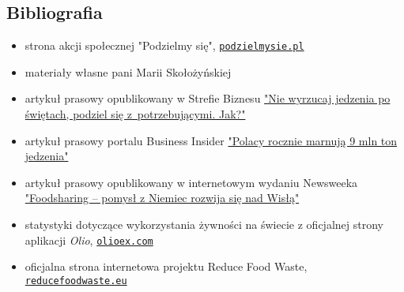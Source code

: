 \documentclass[11pt]{article}
\begin{document}
\subsection*{Bibliografia}
\begin{itemize}
\setlength\itemsep{-0.1em}
\item strona akcji społecznej "Podzielmy się", \href{www.podzielmysie.pl}{\texttt{podzielmysie.pl}}
\item materiały własne pani Marii Skołożyńskiej
\item artykuł prasowy opublikowany w Strefie Biznesu \href{https://strefabiznesu.pl/nie-wyrzucaj-jedzenia-po-swietach-podziel-sie-z-potrzebujacymi-jak/ar/13053810}{"Nie wyrzucaj jedzenia po świętach, podziel się z~potrzebującymi. Jak?"}
\item artykuł prasowy portalu Business Insider \href{https://businessinsider.com.pl/lifestyle/jedzenie/marnowanie-zywnosci-ile-ton-jedzenia-wyrzucaja-polacy/5wnn8yt}{"Polacy rocznie marnują 9 mln ton jedzenia"}
\item artykuł prasowy opublikowany w internetowym wydaniu Newsweeka \href{https://newsweek.pl/polska/foodsharing/qdnp614}{"Foodsharing – pomysł z Niemiec rozwija się nad Wisłą"}

\item statystyki dotyczące wykorzystania żywności na świecie z oficjalnej strony aplikacji  \textit{Olio}, \href{https://olioex.com}{\texttt{olioex.com}}
\item oficjalna strona internetowa projektu Reduce Food Waste, \href{www.reducefoodwaste.eu}{\texttt{reducefoodwaste.eu}}
\end{itemize}
\end{document}
